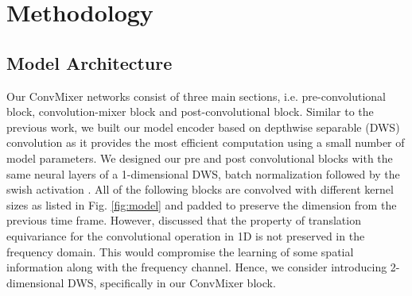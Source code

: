 \documentclass{article}
\begin{document}
\section{Methodology}
\label{sec:method}
\subsection{Model Architecture}
\label{ssec:model}
Our ConvMixer networks consist of three main sections, i.e. pre-convolutional block, convolution-mixer block and post-convolutional block. Similar to the previous work, we built our model encoder based on depthwise separable (DWS) convolution as it provides the most efficient computation using a small number of model parameters. We designed our pre and post convolutional blocks with the same neural layers of a 1-dimensional DWS, batch normalization followed by the swish activation \cite{ramachandran2017searching}. All of the following blocks are convolved with different kernel sizes as listed in Fig. \ref{fig:model} and padded to preserve the dimension from the previous time frame. However, \cite{kim2021broadcasted} discussed that the property of translation equivariance for the convolutional operation in 1D is not preserved in the frequency domain. This would compromise the learning of some spatial information along with the frequency channel. Hence, we consider introducing 2-dimensional DWS, specifically in our ConvMixer block. 
\end{document}
